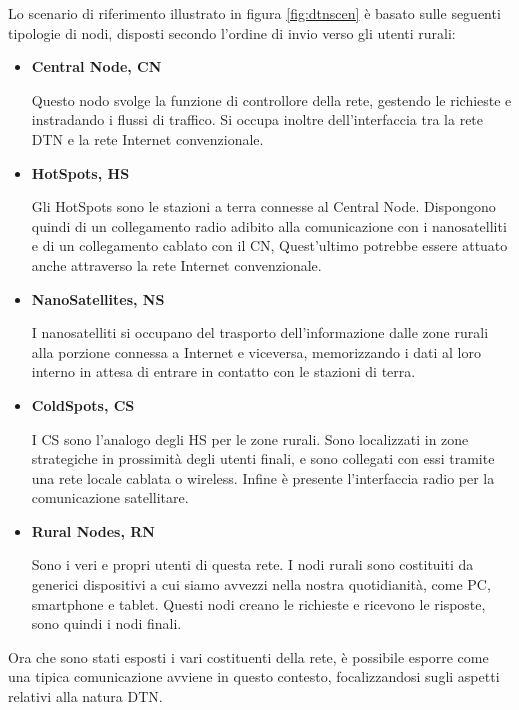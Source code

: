 \documentclass[12pt,a4paper,oneside]{book}
\begin{document}
		Lo scenario di riferimento illustrato in figura \ref{fig:dtnscen} è basato sulle seguenti tipologie di nodi, disposti secondo l'ordine di invio verso gli utenti rurali:
		
		\begin{itemize}
			\item {\bf Central Node, CN}
			
			Questo nodo svolge la funzione di controllore della rete, gestendo le richieste e instradando i flussi di traffico. Si occupa inoltre dell'interfaccia tra la rete DTN e la rete Internet convenzionale.
			
			\item {\bf HotSpots, HS}
			
			Gli HotSpots sono le stazioni a terra connesse al Central Node. Dispongono quindi di un collegamento radio adibito alla comunicazione con i nanosatelliti e di un collegamento cablato con il CN, Quest'ultimo potrebbe essere attuato anche attraverso la rete Internet convenzionale. 
			
			\item {\bf NanoSatellites, NS}
			
			I nanosatelliti si occupano del trasporto dell'informazione dalle zone rurali alla porzione connessa a Internet e viceversa, memorizzando i dati al loro interno in attesa di entrare in contatto con le stazioni di terra.
			
			\item {\bf ColdSpots, CS}
			
			I CS sono l'analogo degli HS per le zone rurali. Sono localizzati in zone strategiche in prossimità degli utenti finali, e sono collegati con essi tramite una rete locale cablata o wireless. Infine è presente l'interfaccia radio per la comunicazione satellitare.
			
			\item {\bf Rural Nodes, RN}
			
			Sono i veri e propri utenti di questa rete. I nodi rurali sono costituiti da generici dispositivi a cui siamo avvezzi nella nostra quotidianità, come PC, smartphone e tablet. Questi nodi creano le richieste e ricevono le risposte, sono quindi i nodi finali.  
						
		\end{itemize}
		
		Ora che sono stati esposti i vari costituenti della rete, è possibile esporre come una tipica comunicazione avviene in questo contesto, focalizzandosi sugli aspetti relativi alla natura DTN. 
		
\end{document}

